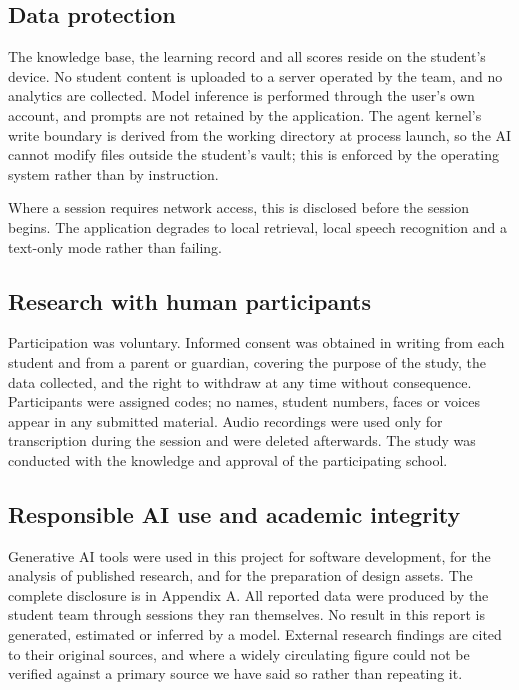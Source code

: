 \documentclass[11pt,a4paper]{article}
\begin{document}
\subsection{Data protection}

The knowledge base, the learning record and all scores reside on the student's device. No
student content is uploaded to a server operated by the team, and no analytics are collected.
Model inference is performed through the user's own account, and prompts are not retained by
the application. The agent kernel's write boundary is derived from the working directory at
process launch, so the AI cannot modify files outside the student's vault; this is enforced
by the operating system rather than by instruction.

Where a session requires network access, this is disclosed before the session begins. The
application degrades to local retrieval, local speech recognition and a text-only mode
rather than failing.

\subsection{Research with human participants}

Participation was voluntary. Informed consent was obtained in writing from each student and
from a parent or guardian, covering the purpose of the study, the data collected, and the
right to withdraw at any time without consequence. Participants were assigned codes; no
names, student numbers, faces or voices appear in any submitted material. Audio recordings
were used only for transcription during the session and were deleted afterwards. The study
was conducted with the knowledge and approval of the participating school.

\subsection{Responsible AI use and academic integrity}

Generative AI tools were used in this project for software development, for the analysis of
published research, and for the preparation of design assets. The complete disclosure is in
Appendix A. All reported data were produced by the student team through sessions they ran
themselves. No result in this report is generated, estimated or inferred by a model.
External research findings are cited to their original sources, and where a widely
circulating figure could not be verified against a primary source we have said so rather
than repeating it.
\end{document}
